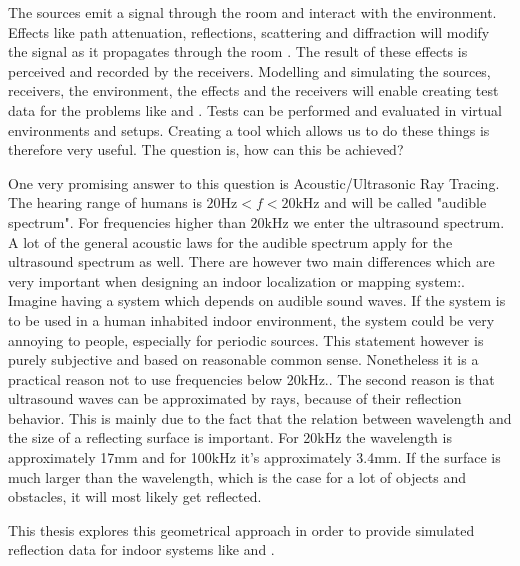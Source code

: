 

The sources emit a signal through the room and interact with the environment. 
Effects like path attenuation, reflections, scattering and diffraction will modify the signal as it propagates through the room \cite{vorlander2013computer}.
The result of these effects is perceived and recorded by the receivers.
Modelling and simulating the sources, receivers, the environment, the effects and the receivers will enable creating test data for the problems like \cite{bordoy2019exploiting} and \cite{ribeiro2011geometrically}.
Tests can be performed and evaluated in virtual environments and setups.
Creating a tool which allows us to do these things is therefore very useful.
The question is, how can this be achieved?

One very promising answer to this question is Acoustic/Ultrasonic Ray Tracing.
The hearing range of humans is $20\text{Hz} < f < 20 \text{kHz}$ and will be called "audible spectrum".
For frequencies higher than $20\text{kHz}$ we enter the ultrasound spectrum.
A lot of the general acoustic laws for the audible spectrum apply for the ultrasound spectrum as well.
There are however two main differences which are very important when designing an indoor localization or mapping system:. Imagine having a system which depends on audible sound waves.
If the system is to be used in a human inhabited indoor environment, the system could be very annoying to people, especially for periodic sources.
This statement however is purely subjective and based on reasonable common sense.
Nonetheless it is a practical reason not to use frequencies below 20kHz.. The second reason is that ultrasound waves can be approximated by rays, because of their reflection behavior.
This is mainly due to the fact that the relation between wavelength and the size of a reflecting surface is important.
For 20kHz the wavelength is approximately 17mm and for 100kHz it's approximately 3.4mm.
If the surface is much larger than the wavelength, which is the case for a lot of objects and obstacles, it will most likely get reflected.

This thesis explores this geometrical approach in order to provide simulated reflection data for indoor systems like \cite{bordoy2019exploiting} and \cite{ribeiro2011geometrically}.
